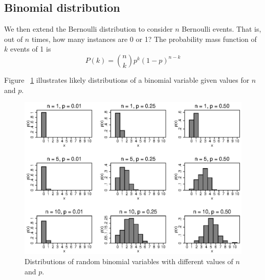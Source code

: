 \subsection{Binomial distribution}
\label{sec:binomial}
We then extend the Bernoulli distribution to consider $n$ Bernoulli events. That is, out of $n$ times, how many instances are 0 or 1? The probability mass function of $k$ events of 1 is
\begin{equation}\label{eq:binomial}
P(k) = {n \choose k}p^k(1-p)^{n-k}
\end{equation}

Figure ~\ref{fig:binomial} illustrates likely distributions of a binomial variable given values for $n$ and $p$.

\begin{figure}
   \centering
   \includegraphics[angle=0,
           width=.75\textwidth]{binomial.eps}
   \caption{Distributions of random binomial variables with different values of $n$ and $p$.}
  \label{fig:binomial}
\end{figure}

